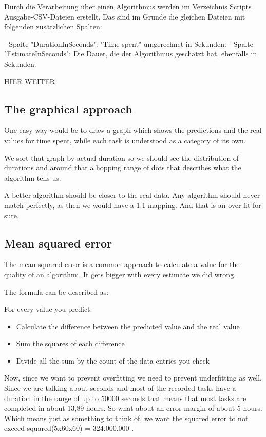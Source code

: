 Durch die Verarbeitung über einen Algorithmus werden im Verzeichnis Scripts\output
Ausgabe-CSV-Dateien erstellt. Das sind im Grunde die gleichen Dateien mit folgenden
zusätzlichen Spalten:

- Spalte "DurationInSeconds": "Time spent" umgerechnet in Sekunden.
- Spalte "EstimateInSeconds": Die Dauer, die der Algorithmus geschätzt hat, ebenfalls in Sekunden.

HIER WEITER

\hypertarget{the-graphical-approach}{%
\subsection{The graphical approach}\label{the-graphical-approach}}

One easy way would be to draw a graph which shows the predictions and
the real values for time spent, while each task is understood as a
category of its own.

We sort that graph by actual duration so we should see the distribution
of durations and around that a hopping range of dots that describes what
the algorithm tells us.

A better algorithm should be closer to the real data. Any algorithm
should never match perfectly, as then we would have a 1:1 mapping. And
that is an over-fit for sure.

\hypertarget{mean-squared-error}{%
\subsection{Mean squared error}\label{mean-squared-error}}

The mean squared error is a common approach to calculate a value for the
quality of an algorithmi. It gets bigger with every estimate we did
wrong.

The formula can be described as:

For every value you predict:

\begin{itemize}
\tightlist
\item
  Calculate the difference between the predicted value and the real
  value
\item
  Sum the squares of each difference
\item
  Divide all the sum by the count of the data entries you check
\end{itemize}

Now, since we want to prevent overfitting we need to prevent
underfitting as well. Since we are talking about seconds and most of the
recorded tasks have a duration in the range of up to 50000 seconds that
means that most tasks are completed in about 13,89 hours. So what about
an error margin of about 5 hours. Which means just as something to think
of, we want the squared error to not exceed squared(5x60x60) =
324.000.000 .

